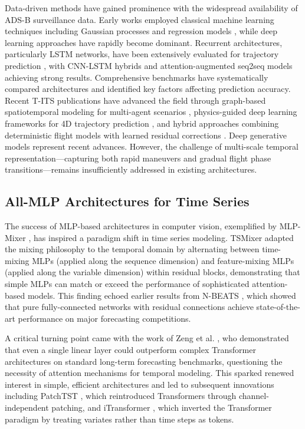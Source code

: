 \documentclass[letterpaper,journal]{IEEEtran}
\begin{document}
Data-driven methods have gained prominence with the widespread availability of ADS-B
surveillance data. Early works employed classical machine learning techniques including
Gaussian processes and regression models \cite{Alligier2015,Sun2020}, while deep
learning approaches have rapidly become dominant. Recurrent architectures, particularly
LSTM networks, have been extensively evaluated for trajectory prediction \cite{Pang2020,
Ayala2023}, with CNN-LSTM hybrids \cite{Chen2022TITS} and attention-augmented
seq2seq models \cite{Georgiou2022,Zhang2020} achieving strong results. Comprehensive
benchmarks \cite{Ayala2023,Schimpf2023} have systematically compared architectures and
identified key factors affecting prediction accuracy. Recent T-ITS publications have
advanced the field through graph-based spatiotemporal modeling for multi-agent scenarios
\cite{Zhang2023GNN}, physics-guided deep learning frameworks for 4D trajectory
prediction \cite{Viera2025,Schuster2024}, and hybrid approaches combining deterministic
flight models with learned residual corrections \cite{Chen2022TITS}. Deep generative
models \cite{Liu2022TRC} represent recent advances. However, the challenge of
multi-scale temporal representation---capturing both rapid maneuvers and gradual flight
phase transitions---remains insufficiently addressed in existing architectures.

\subsection{All-MLP Architectures for Time Series}
The success of MLP-based architectures in computer vision, exemplified by
MLP-Mixer \cite{Tolstikhin2021Mixer}, has inspired a paradigm shift in time
series modeling. TSMixer \cite{Chen2023TSMixer} adapted the mixing philosophy
to the temporal domain by alternating between time-mixing MLPs (applied along the
sequence dimension) and feature-mixing MLPs (applied along the variable dimension)
within residual blocks, demonstrating that simple MLPs can match or exceed the
performance of sophisticated attention-based models. This finding echoed earlier
results from N-BEATS \cite{Oreshkin2020NBEATS}, which showed that pure fully-connected
networks with residual connections achieve state-of-the-art performance on major
forecasting competitions.

A critical turning point came with the work of Zeng et al. \cite{Zeng2023DLinear},
who demonstrated that even a single linear layer could outperform complex Transformer
architectures on standard long-term forecasting benchmarks, questioning the necessity
of attention mechanisms for temporal modeling. This sparked renewed interest in simple,
efficient architectures and led to subsequent innovations including PatchTST
\cite{Nie2023PatchTST}, which reintroduced Transformers through channel-independent
patching, and iTransformer \cite{Liu2024iTransformer}, which inverted the Transformer
paradigm by treating variates rather than time steps as tokens.
\end{document}

